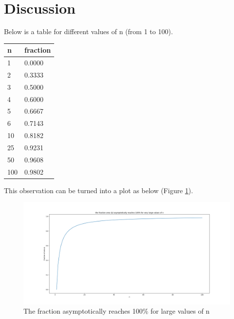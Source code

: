 \documentclass[10pt, twoside]{article}
\begin{document}
\section{Discussion}
Below is a table for different values of n (from 1 to 100).\newline
\begin{tabular}{|l || l |}
	\hline
	\textbf{n} & \textbf{fraction} \\
	\hline
	1 & 0.0000 \\
	\hline
	2 & 0.3333 \\
	\hline
	3 & 0.5000 \\
	\hline
	4 & 0.6000 \\
	\hline
	5 & 0.6667 \\
	\hline
	6 & 0.7143 \\
	\hline
	10 & 0.8182 \\
	\hline
	25 & 0.9231 \\
	\hline
	50 & 0.9608 \\
	\hline
	100 & 0.9802 \\
	\hline
\end{tabular}
\newline
\newline
This observation can be turned into a plot as below (Figure \ref{n_vs_frac}).\newline
\begin{figure}[h!]
\includegraphics[width=\linewidth]{Overall_Plot.png}
\caption{The fraction asymptotically reaches 100\% for large values of n}
\label{n_vs_frac}
\end{figure}
\end{document}
